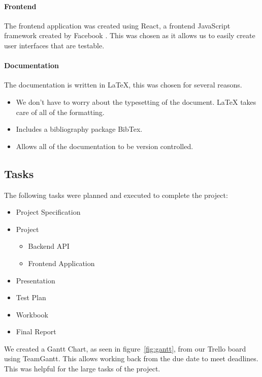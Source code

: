 \documentclass[a4paper,11pt]{article}
\begin{document}
\paragraph{Frontend}

The frontend application was created using React, a frontend JavaScript
framework created by Facebook \autocite{react:10}. This was chosen as it
allows us to easily create user interfaces that are testable.

\paragraph{Documentation}

The documentation is written in \LaTeX, this was chosen for several reasons.

\begin{itemize}
  \item We don't have to worry about the typesetting of the document. \LaTeX{}
    takes care of all of the formatting.
  \item Includes a bibliography package BibTex.
  \item Allows all of the documentation to be version controlled.
\end{itemize}

\subsection{Tasks}

The following tasks were planned and executed to complete the project:

\begin{itemize}
  \item Project Specification
  \item Project
    \begin{itemize}
      \item Backend API
      \item Frontend Application
    \end{itemize}
  \item Presentation
  \item Test Plan
  \item Workbook
  \item Final Report
\end{itemize}

We created a Gantt Chart, as seen in figure~\ref{fig:gantt}, from our Trello
board \autocite{trel:19} using TeamGantt. This allows working back from the
due date to meet deadlines. This was helpful for the large tasks of the project.
\end{document}
